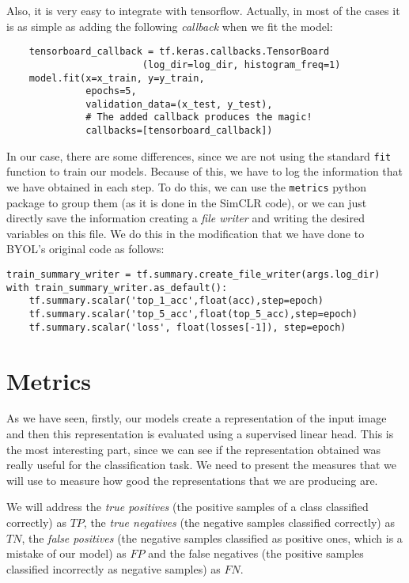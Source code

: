 Also, it is very easy to integrate with tensorflow.  Actually, in most of the cases it is as simple as adding the following \emph{callback} when we fit the model:

\begin{verbatim}
    tensorboard_callback = tf.keras.callbacks.TensorBoard
                        (log_dir=log_dir, histogram_freq=1)
    model.fit(x=x_train, y=y_train, 
              epochs=5, 
              validation_data=(x_test, y_test),
              # The added callback produces the magic! 
              callbacks=[tensorboard_callback])  
\end{verbatim}

In our case, there are some differences, since we are not using the standard \lstinline{fit} function to train our models. Because of this, we have to log the information that we have obtained in each step. To do this, we can use the \lstinline{metrics} python package to group them (as it is done in the SimCLR code), or we can just directly save the information creating a \emph{file writer} and writing the desired variables on this file. We do this in the modification that we have done to BYOL's original code as follows:

\begin{verbatim}
train_summary_writer = tf.summary.create_file_writer(args.log_dir)
with train_summary_writer.as_default():
    tf.summary.scalar('top_1_acc',float(acc),step=epoch)
    tf.summary.scalar('top_5_acc',float(top_5_acc),step=epoch)
    tf.summary.scalar('loss', float(losses[-1]), step=epoch)
\end{verbatim}


\section{Metrics}

As we have seen, firstly, our models create a representation of the input image and then this representation is evaluated using a supervised linear head. This is the most interesting part, since we can see if the representation obtained was really useful for the classification task. We need to present the measures that we will use to measure how good the representations that we are producing are.



\begin{notation}
We will address the \emph{true positives} (the positive samples of a class classified correctly) as $TP$, the \emph{true negatives} (the negative samples classified correctly) as $TN$, the \emph{false positives} (the negative samples classified as positive ones, which is a mistake of our model) as $FP$ and the false negatives (the positive samples classified incorrectly as negative samples) as $FN$.
\end{notation}

